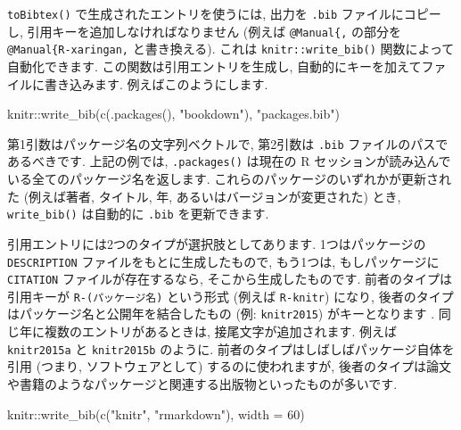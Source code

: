 \documentclass[
  11pt,
  lualatex,
  ja=standard]{bxjsreport}
\newenvironment{Shaded}{\begin{snugshade}}{\end{snugshade}}
\newcommand{\AttributeTok}[1]{\textcolor[rgb]{0.77,0.63,0.00}{#1}}
\newcommand{\DecValTok}[1]{\textcolor[rgb]{0.00,0.00,0.81}{#1}}
\newcommand{\FunctionTok}[1]{\textcolor[rgb]{0.00,0.00,0.00}{#1}}
\newcommand{\NormalTok}[1]{#1}
\newcommand{\SpecialCharTok}[1]{\textcolor[rgb]{0.00,0.00,0.00}{#1}}
\newcommand{\StringTok}[1]{\textcolor[rgb]{0.31,0.60,0.02}{#1}}
\begin{document}
\texttt{toBibtex()} で生成されたエントリを使うには, 出力を \texttt{.bib} ファイルにコピーし, 引用キーを追加しなければなりません (例えば \texttt{@Manual\{,} の部分を \texttt{@Manual\{R-xaringan,} と書き換える). これは \texttt{knitr::write\_bib()} 関数によって自動化できます. この関数は引用エントリを生成し, 自動的にキーを加えてファイルに書き込みます. 例えばこのようにします.

\begin{Shaded}
\begin{Highlighting}[numbers=left,,]
\NormalTok{knitr}\SpecialCharTok{::}\FunctionTok{write\_bib}\NormalTok{(}\FunctionTok{c}\NormalTok{(}\FunctionTok{.packages}\NormalTok{(), }\StringTok{"bookdown"}\NormalTok{), }\StringTok{"packages.bib"}\NormalTok{)}
\end{Highlighting}
\end{Shaded}

第1引数はパッケージ名の文字列ベクトルで, 第2引数は \texttt{.bib} ファイルのパスであるべきです. 上記の例では, \texttt{.packages()} は現在の R セッションが読み込んでいる全てのパッケージ名を返します. これらのパッケージのいずれかが更新された (例えば著者, タイトル, 年, あるいはバージョンが変更された) とき, \texttt{write\_bib()} は自動的に \texttt{.bib} を更新できます.

引用エントリには2つのタイプが選択肢としてあります. 1つはパッケージの \texttt{DESCRIPTION} ファイルをもとに生成したもので, もう1つは, もしパッケージに \texttt{CITATION} ファイルが存在するなら, そこから生成したものです. 前者のタイプは引用キーが \texttt{R-(パッケージ名)} という形式 (例えば \texttt{R-knitr}) になり, 後者のタイプはパッケージ名と公開年を結合したもの (例: \texttt{knitr2015}) がキーとなります . 同じ年に複数のエントリがあるときは, 接尾文字が追加されます. 例えば \texttt{knitr2015a} と \texttt{knitr2015b} のように. 前者のタイプはしばしばパッケージ自体を引用 (つまり, ソフトウェアとして) するのに使われますが, 後者のタイプは論文や書籍のようなパッケージと関連する出版物といったものが多いです.

\begin{Shaded}
\begin{Highlighting}[numbers=left,,]
\NormalTok{knitr}\SpecialCharTok{::}\FunctionTok{write\_bib}\NormalTok{(}\FunctionTok{c}\NormalTok{(}\StringTok{"knitr"}\NormalTok{, }\StringTok{"rmarkdown"}\NormalTok{), }\AttributeTok{width =} \DecValTok{60}\NormalTok{)}
\end{Highlighting}
\end{Shaded}
\end{document}
